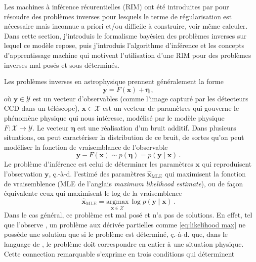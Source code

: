 Les machines à inférence récurentielles (RIM) ont été introduites par \citet{Putzky2017} pour résoudre des problèmes 
inverses pour lesquels le terme de régularisation est nécessaire mais inconnue a priori et/ou difficile à 
construire, voir même calculer. Dans cette section, j'introduis le formalisme bayésien des problèmes inverses sur lequel 
ce modèle repose, puis j'introduis l'algorithme d'inférence et les concepts d'apprentissage machine qui motivent 
l'utilisation d'une RIM pour des problèmes inverses mal-posés et sous-déterminés.

Les problèmes inverses en astrophysique prennent généralement la forme
\begin{equation}\label{eq:inverse problem lineaire}
       \mathbf{y} = F(\mathbf{x}) + \boldsymbol{\eta}\, ,
\end{equation} 
où $\mathbf{y}\in \mathcal{Y}$ est un vecteur d'observables (comme l'image capturé par les détecteurs CCD dans un téléscope), 
$\mathbf{x}\in\mathcal{X}$ est un vecteur de paramètres qui gouverne le phénomène physique qui nous intéresse, 
modélisé par le modèle physique$F:\mathcal{X} \rightarrow \mathcal{Y}$.
Le vecteur $\boldsymbol{\eta}$ est une réalisation d'un bruit additif. 
Dans plusieurs situations, on peut caractériser 
la distribution de ce bruit, de sortes qu'on peut modéliser la fonction de vraisemblance de l'observable
\begin{equation}\label{eq:likelihood intro}
        \mathbf{y} - F(\mathbf{x}) \sim p(\boldsymbol{ \eta}) = p(\mathbf{y} \mid \mathbf{x})\, .
\end{equation} 
Le problème d'inférence est celui de déterminer les paramètres $\mathbf{x}$ qui reproduisent l'observation $\mathbf{y}$, 
ç.-à-d. l'estimé des paramètres $\hat{\mathbf{x}}_{\mathrm{MLE}}$ 
qui maximisent la fonction de vraisemblence (MLE de l'anglais \textit{maximum likelihood estimate}), 
ou de façon équivalente ceux qui maximisent le log de la vraisemblence
\begin{equation}\label{eq:likelihood max}
        \hat{\mathbf{x}}_{\mathrm{MLE}} = \underset{\mathbf{x} \in \mathcal{X}}{\mathrm{argmax}}\, \log p(\mathbf{y} \mid \mathbf{x})\, .
\end{equation} 
Dans le cas général, ce problème est mal posé et n'a pas de solutions. En effet, 
tel que l'observe \citet{Hadamard1902}, un problème aux dérivée partielles comme \eqref{eq:likelihood max} 
ne possède une solution que si le problème est déterminé, ç.-à-d. que, dans le language de \citet{Hadamard1902}, 
le problème doit correspondre en entier à une situation physique. Cette connection remarquable s'exprime en trois conditions qui déterminent 
